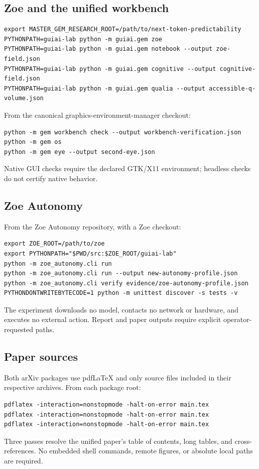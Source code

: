\subsection{Zoe and the unified workbench}
\begin{lstlisting}
export MASTER_GEM_RESEARCH_ROOT=/path/to/next-token-predictability
PYTHONPATH=guiai-lab python -m guiai.gem zoe
PYTHONPATH=guiai-lab python -m guiai.gem notebook --output zoe-field.json
PYTHONPATH=guiai-lab python -m guiai.gem cognitive --output cognitive-field.json
PYTHONPATH=guiai-lab python -m guiai.gem qualia --output accessible-q-volume.json
\end{lstlisting}
From the canonical graphics-environment-manager checkout:
\begin{lstlisting}
python -m gem workbench check --output workbench-verification.json
python -m gem os
python -m gem eye --output second-eye.json
\end{lstlisting}
Native GUI checks require the declared GTK/X11 environment; headless checks do not certify native behavior.

\subsection{Zoe Autonomy}
From the Zoe Autonomy repository, with a Zoe checkout:
\begin{lstlisting}
export ZOE_ROOT=/path/to/zoe
export PYTHONPATH="$PWD/src:$ZOE_ROOT/guiai-lab"
python -m zoe_autonomy.cli run
python -m zoe_autonomy.cli run --output new-autonomy-profile.json
python -m zoe_autonomy.cli verify evidence/zoe-autonomy-profile.json
PYTHONDONTWRITEBYTECODE=1 python -m unittest discover -s tests -v
\end{lstlisting}
The experiment downloads no model, contacts no network or hardware, and executes no external action. Report and paper outputs require explicit operator-requested paths.

\subsection{Paper sources}
Both arXiv packages use pdfLaTeX and only source files included in their respective archives. From each package root:
\begin{lstlisting}
pdflatex -interaction=nonstopmode -halt-on-error main.tex
pdflatex -interaction=nonstopmode -halt-on-error main.tex
pdflatex -interaction=nonstopmode -halt-on-error main.tex
\end{lstlisting}
Three passes resolve the unified paper's table of contents, long tables, and cross-references. No embedded shell commands, remote figures, or absolute local paths are required.

